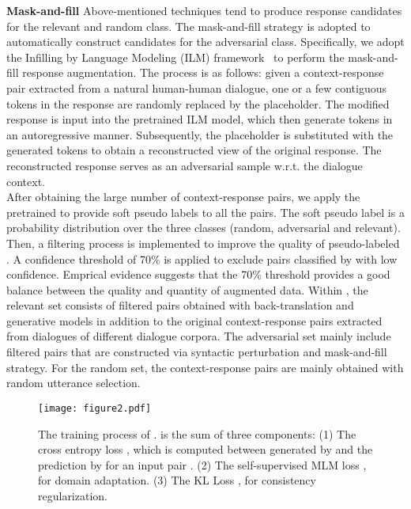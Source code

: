 \documentclass[letterpaper]{article} \usepackage{aaai22}  \usepackage{times}  \usepackage{helvet}  \usepackage{courier}  \usepackage[hyphens]{url}  \usepackage{graphicx} \urlstyle{rm} \def\UrlFont{\rm}  \usepackage{natbib}  \usepackage{caption} \DeclareCaptionStyle{ruled}{labelfont=normalfont,labelsep=colon,strut=off} \frenchspacing  \setlength{\pdfpagewidth}{8.5in}  \setlength{\pdfpageheight}{11in}  \usepackage{algorithm}
\begin{document}
\noindent\textbf{Mask-and-fill}
Above-mentioned techniques tend to produce response candidates for the relevant and random class. The mask-and-fill strategy is adopted to automatically construct candidates for the adversarial class. Specifically, we adopt the Infilling by Language Modeling (ILM) framework~\citep{donahue-etal-2020-enabling} to perform the mask-and-fill response augmentation. The process is as follows: given a context-response pair extracted from a natural human-human dialogue, one or a few contiguous tokens in the response are randomly replaced by the  placeholder. The modified response is input into the pretrained ILM model, which then generate tokens in an autoregressive manner. Subsequently, the  placeholder is substituted with the generated tokens to obtain a reconstructed view of the original response. The reconstructed response serves as an adversarial sample w.r.t. the dialogue context.
\\

\noindent
After obtaining the large number of context-response pairs, we apply the pretrained  to provide soft pseudo labels to all the pairs. The soft pseudo label is a probability distribution over the three classes (random, adversarial and relevant). Then, a filtering process is implemented to improve the quality of pseudo-labeled . A confidence threshold of 70\% is applied to exclude pairs classified by  with low confidence. Emprical evidence suggests that the 70\% threshold provides a good balance between the quality and quantity of augmented data. Within , the relevant set consists of filtered pairs obtained with back-translation and generative models in addition to the original context-response pairs extracted from dialogues of different dialogue corpora. The adversarial set mainly include filtered pairs that are constructed via syntactic perturbation and mask-and-fill strategy. For the random set, the context-response pairs are mainly obtained with random utterance selection. 

\begin{figure}[t]
\centering
\texttt{[image: figure2.pdf]} \caption{The training process of .  is the sum of three components: (1) The cross entropy loss , which is computed between  generated by  and the prediction by  for an input pair  . (2) The self-supervised MLM loss , for domain adaptation. (3) The KL Loss , for consistency regularization.}    

\label{student-model-objective}
\end{figure}
\end{document}

